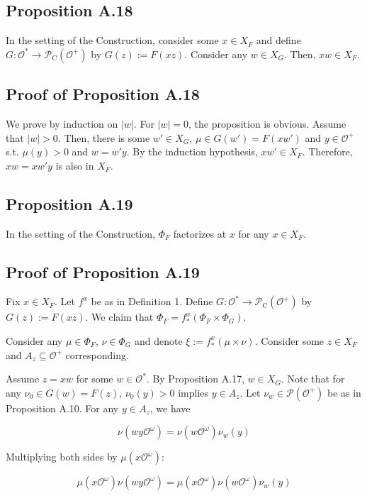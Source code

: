 \documentclass[a4paper]{article}
\newcommand{\Abs}[1]{\lvert #1 \rvert}
\newcommand{\Prob}{\mathcal{P}}
\newcommand{\Obs}{\mathcal{O}}
\newcommand{\ObsO}{\Obs^\omega}
\newcommand{\CC}{\mathcal{P}_{\operatorname{C}}}
\begin{document}
\subsection{Proposition A.18}

In the setting of the Construction, consider some ${x \in X_F}$ and define ${G: \Obs^* \rightarrow \CC(\Obs^+)}$ by ${G(z):=F(xz)}$. Consider any ${w \in X_G}$. Then, ${xw \in X_F}$.

\subsection{Proof of Proposition A.18}

We prove by induction on ${\Abs{w}}$. For ${\Abs{w} = 0}$, the proposition is obvious. Assume that ${\Abs{w} > 0}$. Then, there is some ${w' \in X_G}$, ${\mu \in G(w')=F(xw')}$ and ${y \in \Obs^+}$ s.t. ${\mu(y) > 0}$ and ${w = w'y}$. By the induction hypothesis, ${xw' \in X_F}$. Therefore, ${xw=xw'y}$ is also in ${X_F}$.

\subsection{Proposition A.19}

In the setting of the Construction, ${\Phi_F}$ factorizes at ${x}$ for any ${x \in X_F}$.

\subsection{Proof of Proposition A.19}

Fix ${x \in X_F}$. Let ${f^x}$ be as in Definition 1. Define ${G: \Obs^* \rightarrow \CC(\Obs^+)}$ by ${G(z):=F(xz)}$. We claim that ${\Phi_F = f^x_*(\Phi_F \times \Phi_G)}$.

Consider any ${\mu \in \Phi_F}$, ${\nu \in \Phi_G}$ and denote ${\xi:=f^x_*(\mu \times \nu)}$. Consider some ${z \in X_F}$ and ${A_z \subseteq \Obs^+}$ corresponding.

Assume ${z = xw}$ for some ${w \in \Obs^*}$. By Proposition A.17, ${w \in X_G}$. Note that for any ${\nu_0 \in G(w)=F(z)}$, ${\nu_0(y) > 0}$ implies ${y \in A_z}$. Let ${\nu_w \in \Prob(\Obs^+)}$ be as in Proposition A.10. For any ${y \in A_z}$, we have

$$\nu(wy\ObsO) = \nu(w\ObsO) \nu_w(y)$$

Multiplying both sides by ${\mu(x\ObsO)}$:

$$\mu(x\ObsO) \nu(wy\ObsO) = \mu(x\ObsO) \nu(w\ObsO) \nu_w(y)$$
\end{document}

